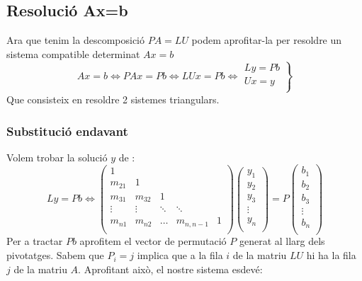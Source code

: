 \documentclass[a4paper,10pt]{article}
\begin{document}
\subsection{Resolució Ax=b}
Ara que tenim la descomposició $PA = LU$ podem aprofitar-la per resoldre un sistema compatible determinat $Ax=b$
\[
  Ax=b \iff PAx = Pb \iff LUx = Pb \iff \left.
  \begin{array}{c}
   Ly = Pb \\
   Ux = y \\
  \end{array}
  \right\}
\]
Que consisteix en resoldre 2 sistemes triangulars.
\subsubsection{Substitució endavant}
Volem trobar la solució $y$ de :
\[
 Ly = Pb \iff
 \left(
  \begin{array}{ccccc}
  1			&			&		&		&		\\	
  m_{21}	&	1		&		&		&		\\
  m_{31}	&	m_{32}	&	1	&		&		\\
  \vdots	&	\vdots	&\ddots	&\ddots	& 		\\
  m_{n1}	&	m_{n2}	&\ldots	&	m_{n,n-1}&	1	\\
  \end{array}
  \right)
  \left(
  \begin{array}{c}
   y_1 \\
   y_2 \\
   y_3 \\
   \vdots \\
   y_n \\
  \end{array}
  \right)
  =
  P
  \left(
  \begin{array}{c}
   b_1 \\
   b_2 \\
   b_3 \\
   \vdots \\
   b_n \\
  \end{array}
  \right)
\]
Per a tractar $Pb$ aprofitem el vector de permutació $P$ generat al llarg dels pivotatges. Sabem que $P_i = j$ implica que a la fila $i$
de la matriu $LU$ hi ha la fila $j$ de la matriu $A$. Aprofitant això, el nostre sistema esdevé:
\end{document}

